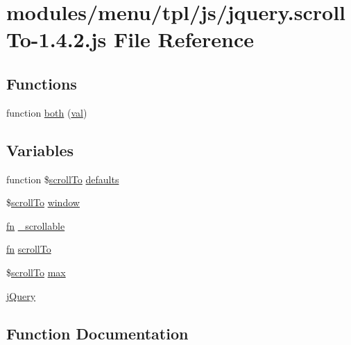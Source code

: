 \hypertarget{jquery_8scrollTo-1_84_82_8js}{}\section{modules/menu/tpl/js/jquery.scroll\+To-\/1.4.2.js File Reference}
\label{jquery_8scrollTo-1_84_82_8js}
\subsection*{Functions}
\begin{DoxyCompactItemize}
\item 
function \hyperlink{jquery_8scrollTo-1_84_82_8js_aba0b99cde63111d7829f219e7077f631}{both} (\hyperlink{ckeditor_2js_2xe__interface_8js_a4fb96abdf073a439bca5e051c333b35d}{val})
\end{DoxyCompactItemize}
\subsection*{Variables}
\begin{DoxyCompactItemize}
\item 
function \$\hyperlink{jquery_8scrollTo-1_84_82_8js_a9192e39878bc163c30c3932049fffce7}{scroll\+To} \hyperlink{jquery_8scrollTo-1_84_82_8js_af27892f8f341abf7c9ea35774a2a1692}{defaults}
\item 
\$\hyperlink{jquery_8scrollTo-1_84_82_8js_a9192e39878bc163c30c3932049fffce7}{scroll\+To} \hyperlink{jquery_8scrollTo-1_84_82_8js_a063b4c7da02a249e0a54d8af5d473cc2}{window}
\item 
\hyperlink{jquery_8min_8js_af453dd93808e2e2826fd92ab8c394cfc}{fn} \hyperlink{jquery_8scrollTo-1_84_82_8js_ab25a06a6c6fc0fb560083e7ec2c2bb11}{\+\_\+scrollable}
\item 
\hyperlink{jquery_8min_8js_af453dd93808e2e2826fd92ab8c394cfc}{fn} \hyperlink{jquery_8scrollTo-1_84_82_8js_a9192e39878bc163c30c3932049fffce7}{scroll\+To}
\item 
\$\hyperlink{jquery_8scrollTo-1_84_82_8js_a9192e39878bc163c30c3932049fffce7}{scroll\+To} \hyperlink{jquery_8scrollTo-1_84_82_8js_a954f280ed2a81443e342686e9a429716}{max}
\item 
\hyperlink{jquery_8scrollTo-1_84_82_8js_a2b1d6f9c448e3ce72f4e1865d6e38d2c}{j\+Query}
\end{DoxyCompactItemize}


\subsection{Function Documentation}
